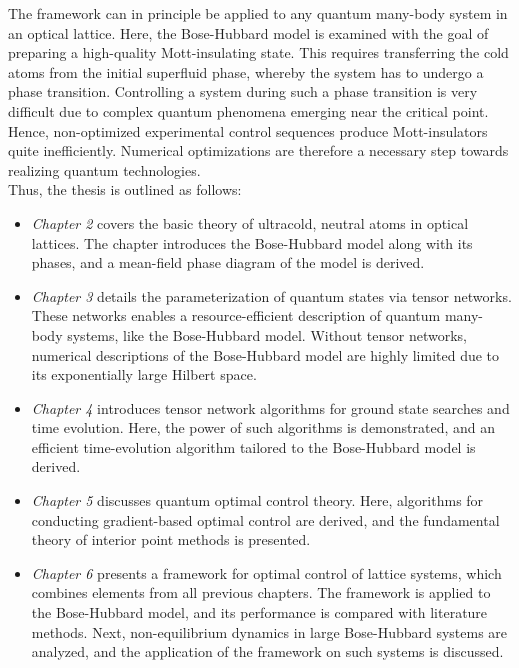 The framework can in principle be applied to any quantum many-body system in an optical lattice. Here, the Bose-Hubbard model is examined with the goal of preparing a high-quality Mott-insulating state. This requires transferring the cold atoms from the initial superfluid phase, whereby the system has to undergo a phase transition. Controlling a system during such a phase transition is very difficult due to complex quantum phenomena emerging near the critical point. Hence, non-optimized experimental control sequences produce Mott-insulators quite inefficiently. Numerical optimizations are therefore a necessary step towards realizing quantum technologies.\\
Thus, the thesis is outlined as follows:
\begin{itemize}
\item[]
\textit{Chapter 2} covers the basic theory of ultracold, neutral atoms in optical lattices. The chapter introduces the Bose-Hubbard model along with its phases, and a mean-field phase diagram of the model is derived.

\item[]
\textit{Chapter 3} details the parameterization of quantum states via tensor networks. These networks enables a resource-efficient description of quantum many-body systems, like the Bose-Hubbard model. Without tensor networks, numerical descriptions of the Bose-Hubbard model are highly limited due to its exponentially large Hilbert space.

\item[]
\textit{Chapter 4} introduces tensor network algorithms for ground state searches and time evolution. Here, the power of such algorithms is demonstrated, and an efficient time-evolution algorithm tailored to the Bose-Hubbard model is derived.

\item[]
\textit{Chapter 5} discusses quantum optimal control theory. Here, algorithms for conducting gradient-based optimal control are derived, and the fundamental theory of interior point methods is presented.

\item[]
\textit{Chapter 6} presents a framework for optimal control of lattice systems, which combines elements from all previous chapters. The framework is applied to the Bose-Hubbard model, and its performance is compared with literature methods. Next, non-equilibrium dynamics in large Bose-Hubbard systems are analyzed, and the application of the framework on such systems is discussed.     
\end{itemize}
